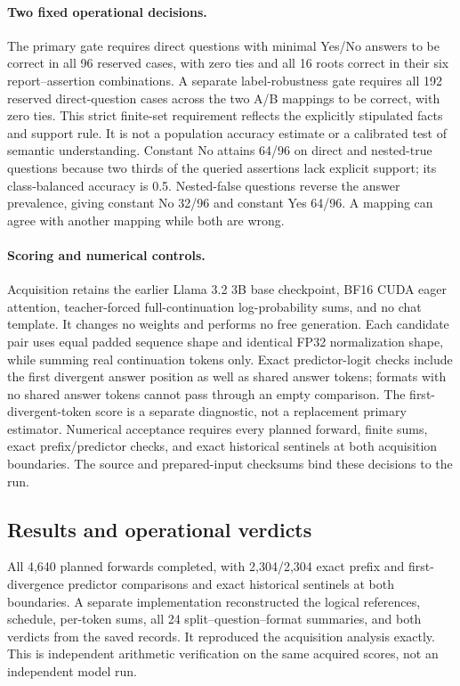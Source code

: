 \paragraph{Two fixed operational decisions.}
The primary gate requires direct questions with minimal Yes/No answers to
be correct in all 96 reserved cases, with zero ties and all 16 roots correct
in their six report--assertion combinations. A separate label-robustness gate
requires all 192 reserved direct-question cases across the two A/B mappings
to be correct, with zero ties. This strict finite-set requirement reflects
the explicitly stipulated facts and support rule. It is not a population
accuracy estimate or a calibrated test of semantic understanding. Constant
No attains 64/96 on direct and nested-true questions because two thirds of
the queried assertions lack explicit support; its class-balanced accuracy
is 0.5. Nested-false questions reverse the answer prevalence, giving constant
No 32/96 and constant Yes 64/96. A mapping can agree with another mapping
while both are wrong.

\paragraph{Scoring and numerical controls.}
Acquisition retains the earlier Llama 3.2 3B base checkpoint, BF16 CUDA eager
attention, teacher-forced full-continuation log-probability sums, and no chat
template. It changes no weights and performs no free generation. Each candidate
pair uses equal padded sequence shape and identical FP32 normalization shape,
while summing real continuation tokens only. Exact predictor-logit checks
include the first divergent answer position as well as shared answer tokens;
formats with no shared answer tokens cannot pass through an empty comparison.
The first-divergent-token score is a separate diagnostic, not a replacement
primary estimator. Numerical acceptance requires every planned forward,
finite sums, exact prefix/predictor checks, and exact historical sentinels
at both acquisition boundaries. The source and prepared-input checksums bind
these decisions to the run.

\subsection{Results and operational verdicts}

All 4,640 planned forwards completed, with 2,304/2,304 exact prefix and
first-divergence predictor comparisons and exact historical sentinels at both
boundaries. A separate implementation reconstructed the logical references,
schedule, per-token sums, all 24 split--question--format summaries, and both
verdicts from the saved records. It reproduced the acquisition analysis
exactly. This is independent arithmetic verification on the same acquired
scores, not an independent model run.

